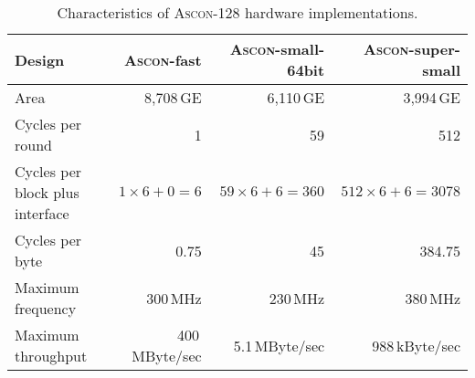 \documentclass[runningheads]{llncs}
\begin{document}
\begin{table}[htb]
  \caption{Characteristics of \textsc{Ascon}-128 hardware implementations.}
\label{tbl:hw-char}
\centering
\begin{tabular}{l@{\hskip 12pt}r@{\hskip 12pt}r@{\hskip 12pt}r} \toprule
  Design & \textsc{Ascon}-fast & \textsc{Ascon}-small-64bit & \textsc{Ascon}-super-small \\
  \midrule
  Area                             & 8,708\,GE            & 6,110\,GE               & 3,994\,GE                 \\
  Cycles per round                 & 1                    & 59                      & 512                       \\
  Cycles per block plus interface  & $1 \times 6 + 0 = 6$ & $59 \times 6 + 6 = 360$ & $512 \times 6 + 6 = 3078$ \\
  Cycles per byte                  & 0.75                 & 45                      & 384.75                    \\
  Maximum frequency                & 300\,MHz             & 230\,MHz                & 380\,MHz                  \\
  Maximum throughput               & 400\,MByte/sec       & 5.1\,MByte/sec          & 988\,kByte/sec            \\
  \bottomrule %
\end{tabular}
\end{table}%




 

\appendix
\end{document}
